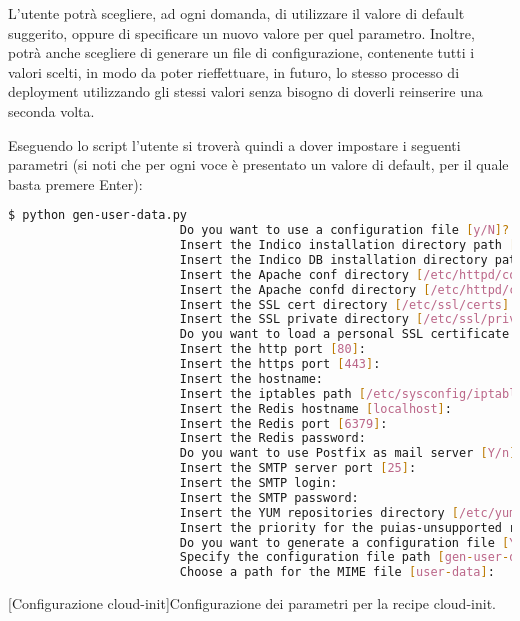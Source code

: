             L'utente potrà scegliere, ad ogni domanda, di utilizzare il valore di default suggerito, oppure di specificare un nuovo valore per quel parametro. Inoltre, potrà anche scegliere di generare un file di configurazione, contenente tutti i valori scelti, in modo da poter rieffettuare, in futuro, lo stesso processo di deployment utilizzando gli stessi valori senza bisogno di doverli reinserire una seconda volta.
            
            Eseguendo lo script  l'utente si troverà quindi a dover impostare i seguenti parametri (si noti che per ogni voce è presentato un valore di default, per il quale basta premere Enter):
            
            \begin{center}
                \begin{minipage}{\linewidth}
                    \begin{lstlisting}[language=bash, gobble=22]
                        $ python gen-user-data.py 
                        Do you want to use a configuration file [y/N]? 
                        Insert the Indico installation directory path [/opt/indico]: 
                        Insert the Indico DB installation directory path [/opt/indico/db]: 
                        Insert the Apache conf directory [/etc/httpd/conf]: 
                        Insert the Apache confd directory [/etc/httpd/conf.d]: 
                        Insert the SSL cert directory [/etc/ssl/certs]: 
                        Insert the SSL private directory [/etc/ssl/private]: 
                        Do you want to load a personal SSL certificate [y/N]? 
                        Insert the http port [80]: 
                        Insert the https port [443]: 
                        Insert the hostname: 
                        Insert the iptables path [/etc/sysconfig/iptables]: 
                        Insert the Redis hostname [localhost]: 
                        Insert the Redis port [6379]: 
                        Insert the Redis password: 
                        Do you want to use Postfix as mail server [Y/n]? 
                        Insert the SMTP server port [25]: 
                        Insert the SMTP login: 
                        Insert the SMTP password: 
                        Insert the YUM repositories directory [/etc/yum.repos.d]: 
                        Insert the priority for the puias-unsupported repository [19]: 
                        Do you want to generate a configuration file [Y/n]? 
                        Specify the configuration file path [gen-user-data.conf]: 
                        Choose a path for the MIME file [user-data]:
                    \end{lstlisting}
                    \captionsetup{textformat=empty,labelformat=empty} \vspace{-2em}
                    [Configurazione cloud-init]{Configurazione dei parametri per la recipe cloud-init.}
                \end{minipage}
            \end{center}
            
